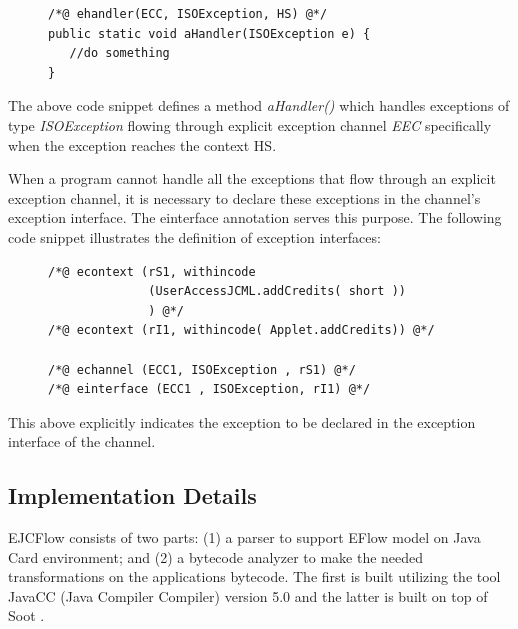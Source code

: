 \documentclass[10pt, conference, compsocconf]{IEEEtran}
\begin{document}
\begin{figure}[ht!]
\centering  
\scriptsize 

\begin{verbatim}
/*@ ehandler(ECC, ISOException, HS) @*/ 
public static void aHandler(ISOException e) {
   //do something 
}
\end{verbatim}

\end{figure}

The above code snippet defines a method \textit{aHandler()} which handles
exceptions of type \textit{ISOException} flowing through explicit exception
channel \textit{EEC} specifically when the exception reaches the context HS. 

When a program cannot handle all the exceptions that flow through an explicit
exception channel, it is necessary to declare these exceptions in the channel's
exception interface. The einterface annotation serves this purpose. The
following code snippet illustrates the definition of exception interfaces:   

\begin{figure}[ht!]
\centering  
\scriptsize 

\begin{verbatim}
/*@ econtext (rS1, withincode 
              (UserAccessJCML.addCredits( short ))
              ) @*/
/*@ econtext (rI1, withincode( Applet.addCredits)) @*/

/*@ echannel (ECC1, ISOException , rS1) @*/
/*@ einterface (ECC1 , ISOException, rI1) @*/
\end{verbatim}
\end{figure}

This above explicitly indicates the exception to be declared in the exception
interface of the channel.

\subsection{Implementation Details}
\label{subsec:detailEflow}

EJCFlow consists of two parts: (1) a parser to support EFlow model on Java Card
environment; and (2) a bytecode analyzer to make the needed transformations on
the applications bytecode. The first is built utilizing the tool JavaCC (Java
Compiler Compiler) version 5.0 and the latter is built on top of Soot \cite{Vallee-RaiGHLPS00}.   
\end{document}

